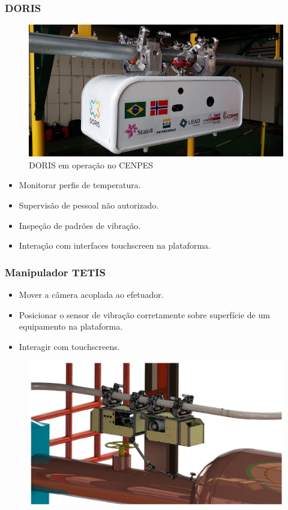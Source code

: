 \documentclass{beamer}
\begin{document}
\begin{frame}
\frametitle{DORIS}
\begin{figure}
\includegraphics[width=0.65\linewidth]{./img/doris_robot.jpg}
\caption{DORIS em operação no CENPES}
\end{figure}
\begin{itemize}
\item Monitorar perfis de temperatura.
\item Supervisão de pessoal não autorizado.
\item Inspeção de padrões de vibração.
\item Interação com interfaces touchscreen na plataforma.
\end{itemize}
\end{frame}


\begin{frame}
\frametitle{Manipulador TETIS}
\begin{itemize}
\item Mover a câmera acoplada ao efetuador.
\item Posicionar o sensor de vibração corretamente sobre superfície de um equipamento na plataforma.
\item Interagir com touchscreens. 
\end{itemize}
\begin{figure}
\includegraphics[width=0.7\linewidth]{./img/doris_manip.png}
\end{figure}
\end{frame}
\end{document}
